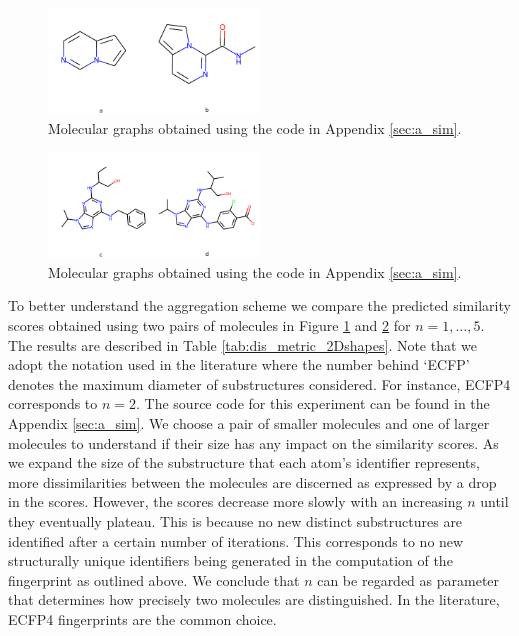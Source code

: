 \begin{figure}[h]
	\centering 
	\includegraphics[width=0.5\textwidth]{test1.png}
	\caption{Molecular graphs obtained using the code in Appendix \ref{sec:a_sim}.}
	\label{fig:molsa}
\end{figure}
\begin{figure}[h]
	\centering 
	\includegraphics[width=0.5\textwidth]{test2.png}
	\caption{Molecular graphs obtained using the code in Appendix \ref{sec:a_sim}.}
	\label{fig:molsb}
\end{figure}
To better understand the aggregation scheme we compare the predicted similarity scores obtained using two pairs of molecules in Figure \ref{fig:molsa} and \ref{fig:molsb} for $n=1,\ldots,5$.
The results are described in Table \ref{tab:dis_metric_2Dshapes}. Note that we adopt the notation used in the literature where the number behind `ECFP' denotes the maximum diameter of substructures considered. For instance, ECFP4 corresponds to $n=2$. The source code for this experiment can be found in the Appendix \ref{sec:a_sim}. We choose a pair of smaller molecules and one of larger molecules to understand if their size has any impact on the similarity scores. As we expand the size of the substructure that each atom's identifier represents, more dissimilarities between the molecules are discerned as expressed by a drop in the scores. However, the scores decrease more slowly with an increasing $n$ until they eventually plateau. This is because no new distinct substructures are identified after a certain number of iterations. This corresponds to no new structurally unique identifiers being generated in the computation of the fingerprint as outlined above. We conclude that $n$ can be regarded as parameter that determines how precisely two molecules are distinguished. In the literature, ECFP4 fingerprints are the common choice.
